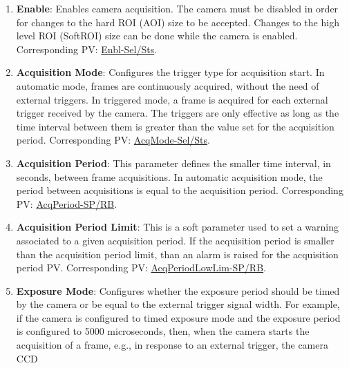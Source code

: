 \documentclass[openany]{article}
\begin{document}
        \begin{enumerate}
                    \item \textbf{Enable}: Enables camera acquisition. The camera must be 
                        disabled in order for changes to the hard ROI (AOI) size to be 
                        accepted. Changes to the high level ROI (SoftROI) size can be done 
                        while the camera is enabled. Corresponding PV: 
                        \hyperlink{pv:enbl}{Enbl-Sel/Sts}.
            \item \textbf{Acquisition Mode}: Configures the trigger type for 
                        acquisition start. In automatic mode, frames are continuously 
                        acquired, without the need of external triggers. In triggered mode,
                        a frame is acquired for each external trigger received by the 
                        camera. The triggers are only effective as long as the time interval
                        between them is greater than the value set for the acquisition 
                        period. Corresponding PV: \hyperlink{pv:acq-mode}{AcqMode-Sel/Sts}.
            \item \textbf{Acquisition Period}: This parameter defines the smaller 
                        time interval, in seconds, between frame acquisitions. In automatic
                        acquisition mode, the period between acquisitions is equal to the
                        acquisition period. Corresponding PV: 
                        \hyperlink{pv:acq-period}{AcqPeriod-SP/RB}.
            \item \textbf{Acquisition Period Limit}: This is a soft parameter used 
                        to set a warning associated to a given acquisition period. If the 
                        acquisition period is smaller than the acquisition period limit, 
                        than an alarm is raised for the acquisition period PV. Corresponding
                        PV: \hyperlink{pv:acq-period-lim}{AcqPeriodLowLim-SP/RB}.
            \item \textbf{Exposure Mode}: Configures whether the exposure period 
                        should be timed by the camera or be equal to the external trigger 
                        signal width. For example, if the camera is configured to timed 
                        exposure mode and the exposure period is configured to 5000 
                        microseconds, then, when the camera starts the acquisition of a 
                        frame, e.g., in response to an external trigger, the camera CCD 

\end{enumerate}
\end{document}
